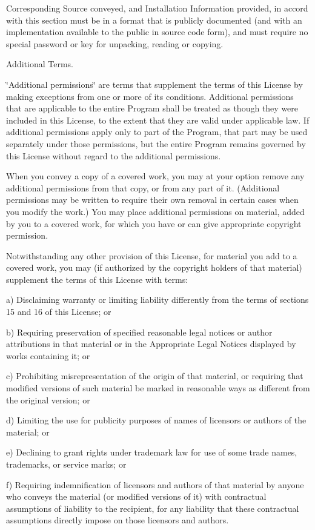 Corresponding Source conveyed, and Installation Information provided, in accord with this section must be in a format that is publicly documented (and with an implementation available to the public in source code form), and must require no special password or key for unpacking, reading or copying.


\begin{DoxyEnumerate}
\item Additional Terms.
\end{DoxyEnumerate}

\char`\"{}\-Additional permissions\char`\"{} are terms that supplement the terms of this License by making exceptions from one or more of its conditions. Additional permissions that are applicable to the entire Program shall be treated as though they were included in this License, to the extent that they are valid under applicable law. If additional permissions apply only to part of the Program, that part may be used separately under those permissions, but the entire Program remains governed by this License without regard to the additional permissions.

When you convey a copy of a covered work, you may at your option remove any additional permissions from that copy, or from any part of it. (Additional permissions may be written to require their own removal in certain cases when you modify the work.) You may place additional permissions on material, added by you to a covered work, for which you have or can give appropriate copyright permission.

Notwithstanding any other provision of this License, for material you add to a covered work, you may (if authorized by the copyright holders of that material) supplement the terms of this License with terms\-: \begin{DoxyVerb}a) Disclaiming warranty or limiting liability differently from the
terms of sections 15 and 16 of this License; or

b) Requiring preservation of specified reasonable legal notices or
author attributions in that material or in the Appropriate Legal
Notices displayed by works containing it; or

c) Prohibiting misrepresentation of the origin of that material, or
requiring that modified versions of such material be marked in
reasonable ways as different from the original version; or

d) Limiting the use for publicity purposes of names of licensors or
authors of the material; or

e) Declining to grant rights under trademark law for use of some
trade names, trademarks, or service marks; or

f) Requiring indemnification of licensors and authors of that
material by anyone who conveys the material (or modified versions of
it) with contractual assumptions of liability to the recipient, for
any liability that these contractual assumptions directly impose on
those licensors and authors.
\end{DoxyVerb}


